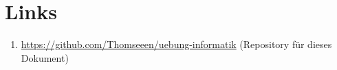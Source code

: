 \documentclass[]{scrartcl}
\begin{document}
\section{Links}
\begin{enumerate}[{1)}]
	\item \href{https://github.com/Thomseeen/uebung-informatik}{https://github.com/Thomseeen/uebung-informatik} (Repository für dieses Dokument)
\end{enumerate}

\begin{comment}
\subsection{CAN-Frames}
Ein CAN-Frame hat 8 Byte Daten. Oft werden in diese 8 Byte mehrere Messwerte codiert. Eine Beschreibungsdatei gibt dann an, an welcher Bit-Position sich ein Wert befindet und welche Bitlänge er hat. So können aus den 8 Byte Daten die für den jeweiligen Messwert relevanten Bits genommen werden. Die sich ergebende Zahl muss dann für den eigentlichen Messwert noch mit einem Faktor und einem Offset verrechnet werden.\\

Implementiere die passende Funktion \lstinline{float GetValueFromFrame(byte[] data, int pos, int offset, float val_factor, float val_offset);}

\begin{enumerate}[{1)}]
	\item Erstelle den Funktionskörper
	\item Kopiere aus dem Byte-Array die relevanten Bytes in ein zweites Byte Array
	\item Schiebe die Bytes aus dem Array in ein \lstinline|long|, um eine gültige Zahleninterpretation zu erhalten
	\item Maskiere und schiebe das \lstinline|long|, um die genauen Bitpositionen/-länge einzuhalten
	\item Verrechne das Ergebnis mit dem Faktor und Offset
\end{enumerate}
\end{comment}
\end{document}
